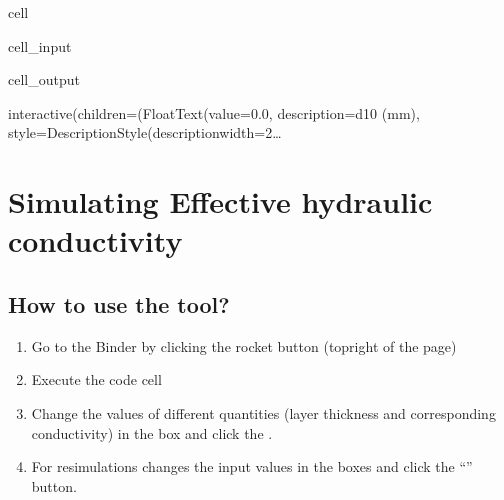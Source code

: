 \documentclass[letterpaper,10pt,english]{jupyterBook}
\begin{document}
\begin{sphinxuseclass}{cell}
\begin{sphinxVerbatimInput}
\begin{sphinxuseclass}{cell_input}
\end{sphinxuseclass}\end{sphinxVerbatimInput}
\begin{sphinxVerbatimOutput}

\begin{sphinxuseclass}{cell_output}
\begin{sphinxVerbatim}[commandchars=\\\{\}]
interactive(children=(FloatText(value=0.0, description=\PYGZsq{}d10 (mm)\PYGZsq{}, style=DescriptionStyle(description\PYGZus{}width=\PYGZsq{}2…
\end{sphinxVerbatim}

\end{sphinxuseclass}\end{sphinxVerbatimOutput}

\end{sphinxuseclass}
\sphinxstepscope


\chapter{Simulating Effective hydraulic conductivity}
\label{\detokenize{content/tools/effective_K:simulating-effective-hydraulic-conductivity}}\label{\detokenize{content/tools/effective_K::doc}}

\section{How to use the tool?}
\label{\detokenize{content/tools/effective_K:how-to-use-the-tool}}\begin{enumerate}
%
\item {} 
\sphinxAtStartPar
Go to the Binder by clicking the rocket button (top\sphinxhyphen{}right of the page)

\item {} 
\sphinxAtStartPar
Execute the code cell

\item {} 
\sphinxAtStartPar
Change the values of different quantities (layer thickness and corresponding conductivity) in the box and click the .

\item {} 
\sphinxAtStartPar
For re\sphinxhyphen{}simulations \sphinxhyphen{} changes the input values in the boxes and click the “” button.

\end{enumerate}
\end{document}
